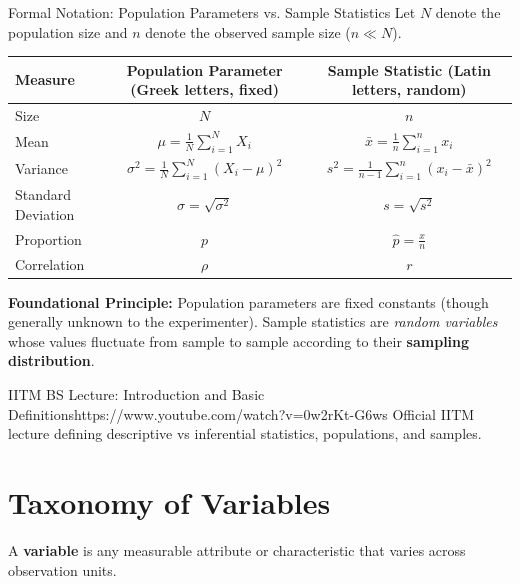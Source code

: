 \begin{definitionbox}{Formal Notation: Population Parameters vs. Sample Statistics}
Let $N$ denote the population size and $n$ denote the observed sample size ($n \ll N$).
\begin{center}
\renewcommand{\arraystretch}{1.3}
\begin{tabular}{lcc}
\toprule
\textbf{Measure} & \textbf{Population Parameter (Greek letters, fixed)} & \textbf{Sample Statistic (Latin letters, random)} \\
\midrule
Size & $N$ & $n$ \\
Mean & $\mu = \frac{1}{N}\sum_{i=1}^N X_i$ & $\bar{x} = \frac{1}{n}\sum_{i=1}^n x_i$ \\
Variance & $\sigma^2 = \frac{1}{N}\sum_{i=1}^N (X_i - \mu)^2$ & $s^2 = \frac{1}{n-1}\sum_{i=1}^n (x_i - \bar{x})^2$ \\
Standard Deviation & $\sigma = \sqrt{\sigma^2}$ & $s = \sqrt{s^2}$ \\
Proportion & $p$ & $\hat{p} = \frac{x}{n}$ \\
Correlation & $\rho$ & $r$ \\
\bottomrule
\end{tabular}
\end{center}
\textbf{Foundational Principle:} Population parameters are fixed constants (though generally unknown to the experimenter). Sample statistics are \emph{random variables} whose values fluctuate from sample to sample according to their \textbf{sampling distribution}.
\end{definitionbox}

\begin{videocard}{IITM BS Lecture: Introduction and Basic Definitions}{https://www.youtube.com/watch?v=0w2rKt-G6ws}
Official IITM lecture defining descriptive vs inferential statistics, populations, and samples.
\end{videocard}

\section{Taxonomy of Variables}

A \textbf{variable} is any measurable attribute or characteristic that varies across observation units.


